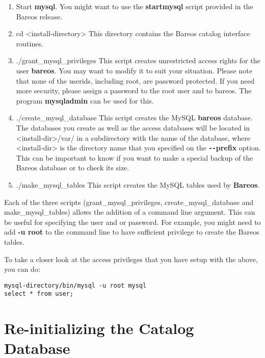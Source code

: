\begin{enumerate}
\item Start {\bf mysql}. You might want to use the {\bf startmysql}  script
   provided in the Bareos release.

\item cd {\textless}install-directory{\textgreater}
   This directory contains the Bareos catalog  interface routines.

\item ./grant\_mysql\_privileges
   This script creates unrestricted access rights for the user {\bf bareos}.
   You may  want to modify it to suit your situation. Please
   note that none of the userids, including root, are password protected.
   If you need more security, please assign a password to the root user
   and to bareos. The program {\bf mysqladmin} can be used for this.

\item ./create\_mysql\_database
   This script creates the MySQL {\bf bareos} database.  The databases you
   create as well as the access databases will be located in
   {\textless}install-dir{\textgreater}/var/ in a subdirectory with the name of the
   database, where {\textless}install-dir{\textgreater} is the directory name that you
   specified on the {\bf \verb:--:prefix} option.  This can be important to
   know if you want to make a special backup of the Bareos database or to
   check its size.

\item ./make\_mysql\_tables
   This script creates the MySQL tables used by {\bf Bareos}.
\end{enumerate}

Each of the three scripts (grant\_mysql\_privileges, create\_mysql\_database
and make\_mysql\_tables) allows the addition of a command line argument. This
can be useful for specifying the user and or password. For example, you might
need to add {\bf -u root} to the command line to have sufficient privilege to
create the Bareos tables.

To take a closer look at the access privileges that you have setup with the
above, you can do:

\footnotesize
\begin{verbatim}
mysql-directory/bin/mysql -u root mysql
select * from user;
\end{verbatim}
\normalsize

\section{Re-initializing the Catalog Database}

